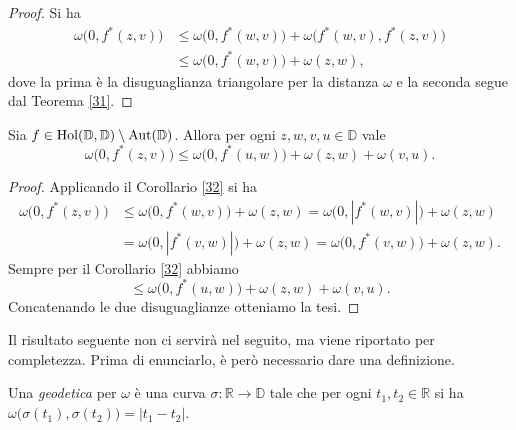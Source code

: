\begin{proof}
  Si ha
  \begin{align*}
    \omega\bigl(0,f^*(z,v)\bigr) & \le \omega\bigl(0,f^*(w,v)\bigr)+\omega\bigl(f^*(w,v),f^*(z,v)\bigr) \\
    & \le \omega\bigl(0,f^*(w,v)\bigr)+\omega(z,w),
  \end{align*}
  dove la prima è la disuguaglianza triangolare per la distanza $\omega$ e la seconda segue dal Teorema \ref{31}.
\end{proof}

\begin{cor} \label{33}
  Sia $f \in \text{\normalfont{Hol}}(\mathbb{D},\mathbb{D})\setminus\text{\normalfont{Aut}}(\mathbb{D})$. Allora per ogni $z, w, v, u \in \mathbb{D}$ vale
  \begin{equation}
    \omega\bigl(0, f^*(z,v)\bigr) \le \omega\bigl(0, f^*(u,w)\bigr)+\omega(z,w)+\omega(v,u).
  \end{equation}
\end{cor}
\begin{proof}
  Applicando il Corollario \ref{32} si ha
  \begin{align*}
    \omega\bigl(0,f^*(z,v)\bigr) & \le \omega\bigl(0,f^*(w,v)\bigr)+\omega(z,w) =\omega\bigl(0,|f^*(w,v)|\bigr)+\omega(z,w) \\
    & =\omega\bigl(0,|f^*(v,w)|\bigr)+\omega(z,w)=\omega\bigl(0,f^*(v,w)\bigr)+\omega(z,w).
  \end{align*}
  Sempre per il Corollario \ref{32} abbiamo
  $$\le \omega\bigl(0,f^*(u,w)\bigr)+\omega(z,w)+\omega(v,u).$$
  Concatenando le due disuguaglianze otteniamo la tesi.
\end{proof}

Il risultato seguente non ci servirà nel seguito, ma viene riportato per completezza. Prima di enunciarlo, è però necessario dare una definizione.

\begin{defn}
  Una \textit{geodetica} per $\omega$ è una curva $\sigma: \mathbb{R} \longrightarrow \mathbb{D}$ tale che per ogni $t_1,t_2 \in \mathbb{R}$ si ha $\omega\bigl(\sigma(t_1),\sigma(t_2)\bigr)=|t_1-t_2|$.
\end{defn}

